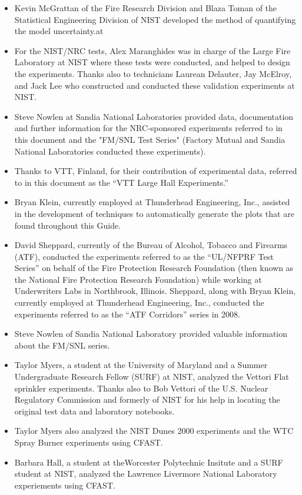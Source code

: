 \documentclass[12pt]{book}
\begin{document}
\begin{itemize}
\item Kevin McGrattan of the Fire Research Division and Blaza Toman of the Statistical Engineering Division of NIST developed the method of quantifying the model uncertainty.at
\item For the NIST/NRC tests, Alex Maranghides was in charge of the Large Fire Laboratory at NIST where these tests were conducted, and helped to design the experiments. Thanks also to technicians Laurean Delauter, Jay McElroy, and Jack Lee who constructed and conducted these validation experiments at NIST. 

\item Steve Nowlen at Sandia National Laboratories provided data, documentation and further information for the NRC-sponsored experiments referred to in this document and the "FM/SNL Test Series" (Factory Mutual and Sandia National Laboratories conducted these experiments). 

\item Thanks to VTT, Finland, for their contribution of experimental data, referred to in this document as the ``VTT Large Hall Experiments.''

\item Bryan Klein, currently employed at Thunderhead Engineering, Inc., assisted in the development of techniques to automatically generate the plots that are found throughout this Guide.

\item David Sheppard, currently of the Bureau of Alcohol, Tobacco and Firearms (ATF), conducted the experiments referred to as the ``UL/NFPRF Test Series'' on behalf of the Fire Protection Research Foundation (then known as the National Fire Protection Research Foundation) while working at Underwriters Labs in Northbrook, Illinois. Sheppard, along with Bryan Klein, currently employed at Thunderhead Engineering, Inc., conducted the experiments referred to as the ``ATF Corridors'' series in 2008.

\item Steve Nowlen of Sandia National Laboratory provided valuable information about the FM/SNL series.

\item Taylor Myers, a student at the University of Maryland and a Summer Undergraduate Research Fellow (SURF) at NIST, analyzed the Vettori Flat sprinkler experiments. Thanks also to Bob Vettori of the U.S. Nuclear Regulatory Commission and formerly of NIST for his help in locating the original test data and laboratory notebooks.

\item Taylor Myers also analyzed the NIST Dunes 2000 experiments and the WTC Spray Burner experiments using CFAST.

\item Barbara Hall, a student at theWorcester Polytechnic Insitute and a SURF student at NIST, analyzed the Lawrence Livermore National Laboratory experiements using CFAST.

\end{itemize}
\end{document}
